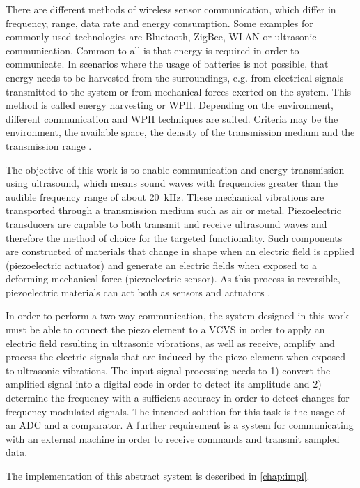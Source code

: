 \documentclass[
	english,
	ruledheaders=section, %
	class=report,%
	thesis={type=Project Seminar Report},%
	accentcolor=TUDa-1d, %
	custommargins=false,%
	marginpar=false,%
	parskip=half-,%
	fontsize=11pt,%
]{tudapub}
\begin{document}
There are different methods of wireless sensor communication, which differ in frequency, range, data rate and energy consumption. Some examples for commonly used technologies are Bluetooth, ZigBee, WLAN or ultrasonic communication. Common to all is that energy is required in order to communicate. In scenarios where the usage of batteries is not possible, that energy needs to be harvested from the surroundings, e.g. from electrical signals transmitted to the system or from mechanical forces exerted on the system. This method is called energy harvesting or \gls{WPH}. Depending on the environment, different communication and \gls{WPH} techniques are suited. Criteria may be the environment, the available space, the density of the transmission medium and the transmission range \autocite{valentaHarvestingWirelessPower2014}.

The objective of this work is to enable communication and energy transmission using ultrasound, which means sound waves with frequencies greater than the audible frequency range of about \SI{20}{\kilo\hertz}. These mechanical vibrations are transported through a transmission medium such as air or metal.
Piezoelectric transducers are capable to both transmit and receive ultrasound waves and therefore the method of choice for the targeted functionality. Such components are constructed of materials that change in shape when an electric field is applied (piezoelectric actuator) and generate an electric fields when exposed to a deforming mechanical force (piezoelectric sensor). As this process is reversible, piezoelectric materials can act both as sensors and actuators \autocite{vivesPiezoelectricTransducersApplications2008}.

In order to perform a two-way communication, the system designed in this work must be able to connect the piezo element to a \gls{VCVS} in order to apply an electric field resulting in ultrasonic vibrations, as well as receive, amplify and process the electric signals that are induced by the piezo element when exposed to ultrasonic vibrations. The input signal processing needs to 1) convert the amplified signal into a digital code in order to detect its amplitude and 2) determine the frequency with a sufficient accuracy in order to detect changes for frequency modulated signals. The intended solution for this task is the usage of an \gls{ADC} and a comparator. A further requirement is a system for communicating with an external machine in order to receive commands and transmit sampled data.

The implementation of this abstract system is described in \cref{chap:impl}.
\end{document}
